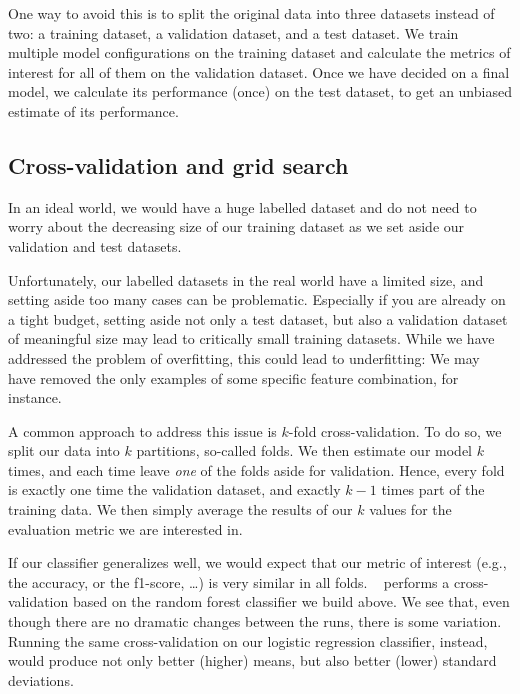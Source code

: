 One way to avoid this is to split the original data into three
datasets instead of two: a training dataset, a validation dataset, and
a test dataset.  We train multiple model configurations on the
training dataset and calculate the metrics of interest for all of them
on the validation dataset.  Once we have decided on a final model, we
calculate its performance (once) on the test dataset, to get an
unbiased estimate of its performance.



\subsection{Cross-validation and grid search}
\label{sec:crossvalidation}
In an ideal world, we would have a huge labelled dataset and do not
need to worry about the decreasing size of our training dataset as we
set aside our validation and test datasets.

Unfortunately, our labelled datasets in the real world have a limited
size, and setting aside too many cases can be problematic. Especially
if you are already on a tight budget, setting aside not only a test
dataset, but also a validation dataset of meaningful size may lead to
critically small training datasets. While we have addressed the
problem of overfitting, this could lead to underfitting: We may have
removed the only examples of some specific feature combination, for
instance.

A common approach to address this issue is $k$-fold
cross-validation. To do so, we split our data into $k$ partitions,
so-called folds. We then estimate our model $k$ times, and each time
leave \emph{one} of the folds aside for validation. Hence, every fold
is exactly one time the validation dataset, and exactly $k-1$ times
part of the training data. We then simply average the results of our
$k$ values for the evaluation metric we are interested in.

If our classifier generalizes well, we would expect that our metric of
interest (e.g., the accuracy, or the f1-score, \ldots) is very similar
in all folds. ~ performs a cross-validation
based on the random forest classifier we build above. We see that,
even though there are no dramatic changes between the runs, there is
some variation. Running the same cross-validation on our logistic
regression classifier, instead, would produce not only better (higher)
means, but also better (lower) standard deviations.


